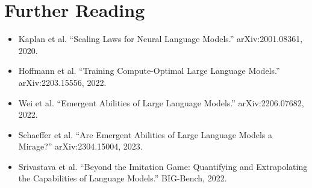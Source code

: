 \documentclass{article}
\begin{document}
\section*{Further Reading}
\begin{itemize}
  \item Kaplan et al. ``Scaling Laws for Neural Language Models.'' arXiv:2001.08361, 2020.
  \item Hoffmann et al. ``Training Compute-Optimal Large Language Models.'' arXiv:2203.15556, 2022.
  \item Wei et al. ``Emergent Abilities of Large Language Models.'' arXiv:2206.07682, 2022.
  \item Schaeffer et al. ``Are Emergent Abilities of Large Language Models a Mirage?'' arXiv:2304.15004, 2023.
  \item Srivastava et al. ``Beyond the Imitation Game: Quantifying and Extrapolating the Capabilities of Language Models.'' BIG-Bench, 2022.
\end{itemize}
\end{document}

